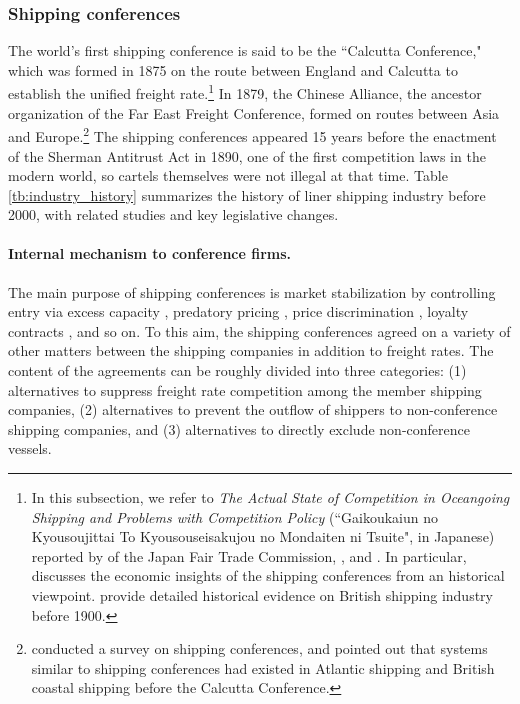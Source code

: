 \documentclass[11pt]{article}
\begin{document}
\subsubsection{Shipping conferences}\label{subsec:shipping_conference}


The world's first shipping conference is said to be the ``Calcutta Conference," which was formed in 1875 on the route between England and Calcutta to establish the unified freight rate.\footnote{In this subsection, we refer to \textit{The Actual State of Competition in Oceangoing Shipping and Problems with Competition Policy} (``Gaikoukaiun no Kyousoujittai To Kyousouseisakujou no Mondaiten ni Tsuite", in Japanese) reported by \cite{gaikoukaiun_no_kyousoujittai2006} of the Japan Fair Trade Commission,  \cite{branch2013maritime}, and \cite{sjostrom2013competition}. In particular, \cite{sjostrom1989collusion} discusses the economic insights of the shipping conferences from an historical viewpoint. \cite{morton1997entry} provide detailed historical evidence on British shipping industry before 1900.} In 1879, the Chinese Alliance, the ancestor organization of the Far East Freight Conference, formed on routes between Asia and Europe.\footnote{\cite{sjostrom2004ocean} conducted a survey on shipping conferences, and pointed out that systems similar to shipping conferences had existed in Atlantic shipping and British coastal shipping before the Calcutta Conference.} The shipping conferences appeared 15 years before the enactment of the Sherman Antitrust Act in 1890, one of the first competition laws in the modern world, so cartels themselves were not illegal at that time. Table \ref{tb:industry_history} summarizes the history of liner shipping industry before 2000, with related studies and key legislative changes.

\paragraph{Internal mechanism to conference firms.}
The main purpose of shipping conferences is market stabilization by controlling entry via excess capacity \citep{fusillo2003excess}, predatory pricing \citep{morton1997entry,podolny1999social}, price discrimination \citep{fox1992empirical,clyde1998market}, loyalty contracts \citep{marin2003exclusive}, and so on. To this aim, the shipping conferences agreed on a variety of other matters between the shipping companies in addition to freight rates. The content of the agreements can be roughly divided into three categories: (1) alternatives to suppress freight rate competition among the member shipping companies, (2) alternatives to prevent the outflow of shippers to non-conference shipping companies, and (3) alternatives to directly exclude non-conference vessels.
\end{document}
